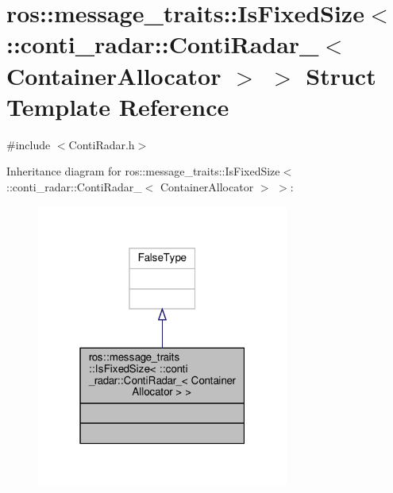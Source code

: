 \hypertarget{structros_1_1message__traits_1_1IsFixedSize_3_01_1_1conti__radar_1_1ContiRadar___3_01ContainerAllocator_01_4_01_4}{}\section{ros\+:\+:message\+\_\+traits\+:\+:Is\+Fixed\+Size$<$ \+:\+:conti\+\_\+radar\+:\+:Conti\+Radar\+\_\+$<$ Container\+Allocator $>$ $>$ Struct Template Reference}
\label{structros_1_1message__traits_1_1IsFixedSize_3_01_1_1conti__radar_1_1ContiRadar___3_01ContainerAllocator_01_4_01_4}


{\ttfamily \#include $<$Conti\+Radar.\+h$>$}



Inheritance diagram for ros\+:\+:message\+\_\+traits\+:\+:Is\+Fixed\+Size$<$ \+:\+:conti\+\_\+radar\+:\+:Conti\+Radar\+\_\+$<$ Container\+Allocator $>$ $>$\+:\nopagebreak
\begin{figure}[H]
\begin{center}
\leavevmode
\includegraphics[width=235pt]{d7/d15/structros_1_1message__traits_1_1IsFixedSize_3_01_1_1conti__radar_1_1ContiRadar___3_01ContainerAl9795f76c7275e0cae7a7987e02275651}
\end{center}
\end{figure}


